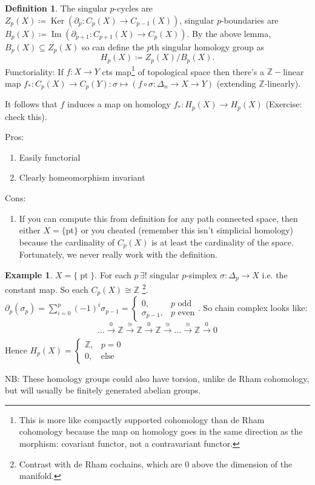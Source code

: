\documentclass[10pt]{article}
\theoremstyle{plain}
\theoremstyle{definition}
\newtheorem{defn}[thm]{Definition} %
\newtheorem{exmp}[thm]{Example} %
\newcommand{\sumfromto}[2]{\sum\limits_{#1}^{#2}}
\DeclareMathOperator{\Ker}{Ker}
\DeclareMathOperator{\Ima}{Im}
\newcommand{\mycasesthing}[2]{\begin{cases} #1 \\ #2\end{cases}}
\DeclareMathOperator{\pt}{pt}
\newcommand{\homX}[1]{H_{#1}(X)}
\newcommand{\ZX}[1]{Z_{#1}(X)}
\newcommand{\BX}[1]{B_{#1}(X)}
\begin{document}
\begin{defn}
The singular $p$-cycles are $\ZX{p} \coloneqq \Ker(\partial_p:C_p(X)\to C_{p-1}(X))$, singular $p$-boundaries are $\BX{p} \coloneqq \Ima (\partial_{p+1} : C_{p+1}(X) \to C_p(X))$. By the above lemma, $\BX{p} \subseteq \ZX{p}$ so can define the $p$th singular homology group as $$\homX{p} \coloneqq \ZX{p} / \BX{p}.$$
\noindent
Functoriality: If $f:X\to Y$ cts map\footnote{This is more like compactly supported cohomology than de Rham cohomology because the map on homology goes in the same direction as the morphism: covariant functor, not a contravariant functor. } of topological space then there's a $\mathbb{Z}-$linear map $f_*:C_p(X) \to C_p(Y) : \sigma \mapsto (f\circ \sigma : \Delta_n \to X \to Y)$ (extending $\mathbb{Z}$-linearly).
\end{defn}

It follows that $f$ induces a map on homology $f_*: H_p(X) \to H_p(X)$ (Exercise: check this).

Pros:
\begin{enumerate}
    \item Easily functorial
    \item Clearly homeomorphism invariant
\end{enumerate}
Cons:
\begin{enumerate}
    \item If you can compute this from definition for any path connected space, then either $X = \{$pt$\}$ or you cheated (remember this isn't simplicial homology) because the cardinality of $C_p(X)$ is at least the cardinality of the space. Fortunately, we never really work with the definition.
\end{enumerate}
\begin{exmp}
    $X = \{\pt\}$. For each $p\, \exists ! $ singular $p$-simplex $\sigma:\Delta_p \to X$ i.e. the constant map. So each $C_p(X) \cong \mathbb{Z}$ \footnote{Contrast with de Rham cochains, which are 0 above the dimension of the manifold.}. $\partial_p(\sigma_p) = \sumfromto{i=0}{p} (-1)^i \sigma_{p-1} = \mycasesthing{0,& p \text{ odd}}{\sigma_{p-1},& p \text{ even}}$. So chain complex looks like:
    $$
    \ldots \xrightarrow[]{0}\mathbb{Z}\xrightarrow[]{\cong} \mathbb{Z}  \xrightarrow[]{0}  \mathbb{Z} \xrightarrow[]{\cong}\ldots \xrightarrow[]{\cong}\mathbb{Z}    \xrightarrow[]{0} 0
    $$
    Hence $H_p(X) =\mycasesthing{ \mathbb{Z},& p= 0}{0,&\text{else}} $
\end{exmp}
NB: These homology groups could also have torsion, unlike de Rham cohomology, but will usually be finitely generated abelian groups.
\end{document}
